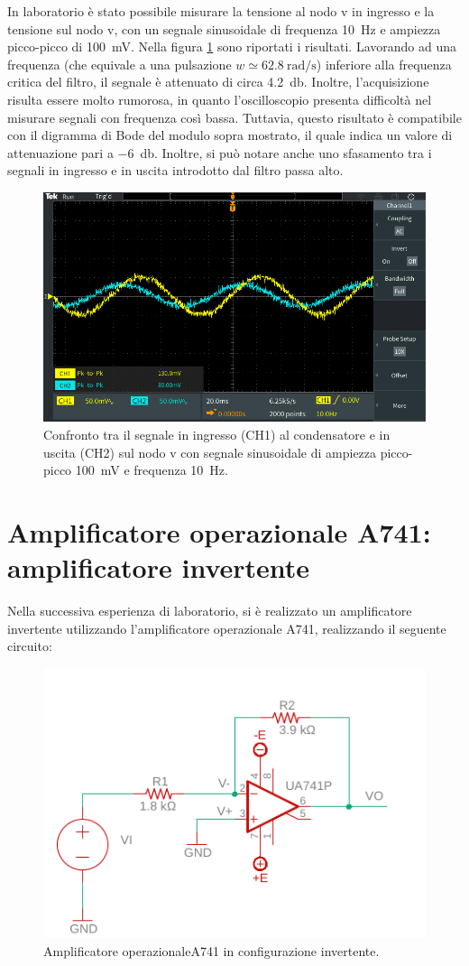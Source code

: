 \noindent
In laboratorio è stato possibile misurare la tensione al nodo v in ingresso e la tensione sul nodo v, con un segnale sinusoidale di frequenza \SI{10}{\hertz} e ampiezza picco-picco di \SI{100}{\milli\volt}. Nella figura \ref{fig:hpf_10hz} sono riportati i risultati. Lavorando ad una frequenza (che equivale a una pulsazione $w\simeq\SI{62.8}{\radian/\second}$) inferiore alla frequenza critica del filtro, il segnale è attenuato di circa \SI{4.2}{\decibel}. Inoltre, l'acquisizione risulta essere molto rumorosa, in quanto l'oscilloscopio presenta difficoltà nel misurare segnali con frequenza così bassa. Tuttavia, questo risultato è compatibile con il digramma di Bode del modulo sopra mostrato, il quale indica un valore di attenuazione pari a \SI{-6}{\decibel}. Inoltre, si può notare anche uno sfasamento tra i segnali in ingresso e in uscita introdotto dal filtro passa alto.
\begin{figure}[h!]
	\centering
	\includegraphics[width=0.7\linewidth]{./ImageFiles/Laboratorio 4/TEK00003}
	\caption{Confronto tra il segnale in ingresso (CH1) al condensatore e in uscita (CH2) sul nodo v con segnale sinusoidale di ampiezza picco-picco \SI{100}{\milli\volt} e frequenza \SI{10}{\hertz}.}
	\label{fig:hpf_10hz}
\end{figure}

\section{Amplificatore operazionale \textmu A741: amplificatore invertente}
Nella successiva esperienza di laboratorio, si è realizzato un amplificatore invertente utilizzando l'amplificatore operazionale \textmu A741, realizzando il seguente circuito:
\begin{figure}[h!]
	\centering
	\includegraphics[width=0.6\linewidth]{./OtherFiles/Laboratorio 4/opam_inv}
	\caption{Amplificatore operazionale\textmu A741 in configurazione invertente.}
	\label{fig:opamp_inv}
\end{figure}

